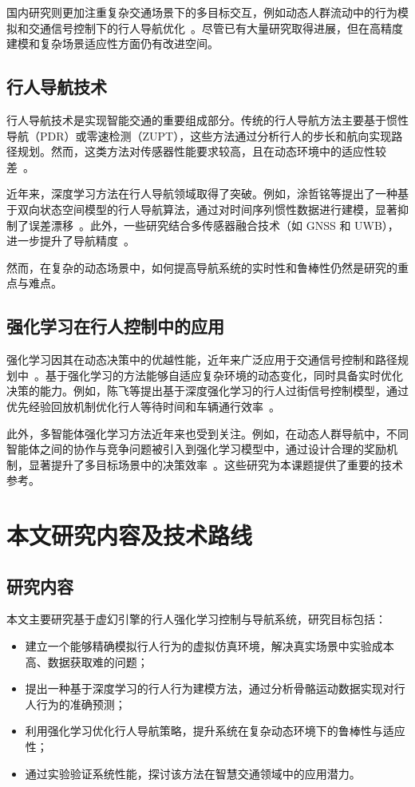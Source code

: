 国内研究则更加注重复杂交通场景下的多目标交互，例如动态人群流动中的行为模拟和交通信号控制下的行人导航优化~\cite{key10}。尽管已有大量研究取得进展，但在高精度建模和复杂场景适应性方面仍有改进空间。

\subsection{行人导航技术}

行人导航技术是实现智能交通的重要组成部分。传统的行人导航方法主要基于惯性导航（PDR）或零速检测（ZUPT），这些方法通过分析行人的步长和航向实现路径规划。然而，这类方法对传感器性能要求较高，且在动态环境中的适应性较差~\cite{key11,key12}。

近年来，深度学习方法在行人导航领域取得了突破。例如，涂哲铭等提出了一种基于双向状态空间模型的行人导航算法，通过对时间序列惯性数据进行建模，显著抑制了误差漂移~\cite{key13}。此外，一些研究结合多传感器融合技术（如 GNSS 和 UWB），进一步提升了导航精度~\cite{key14}。

然而，在复杂的动态场景中，如何提高导航系统的实时性和鲁棒性仍然是研究的重点与难点。

\subsection{强化学习在行人控制中的应用}

强化学习因其在动态决策中的优越性能，近年来广泛应用于交通信号控制和路径规划中~\cite{key15}。基于强化学习的方法能够自适应复杂环境的动态变化，同时具备实时优化决策的能力。例如，陈飞等提出基于深度强化学习的行人过街信号控制模型，通过优先经验回放机制优化行人等待时间和车辆通行效率~\cite{key16}。

此外，多智能体强化学习方法近年来也受到关注。例如，在动态人群导航中，不同智能体之间的协作与竞争问题被引入到强化学习模型中，通过设计合理的奖励机制，显著提升了多目标场景中的决策效率~\cite{key17}。这些研究为本课题提供了重要的技术参考。

\section{本文研究内容及技术路线}

\subsection{研究内容}

本文主要研究基于虚幻引擎的行人强化学习控制与导航系统，研究目标包括：
\begin{itemize}
    \item 建立一个能够精确模拟行人行为的虚拟仿真环境，解决真实场景中实验成本高、数据获取难的问题；
    \item 提出一种基于深度学习的行人行为建模方法，通过分析骨骼运动数据实现对行人行为的准确预测；
    \item 利用强化学习优化行人导航策略，提升系统在复杂动态环境下的鲁棒性与适应性；
    \item 通过实验验证系统性能，探讨该方法在智慧交通领域中的应用潜力。
\end{itemize}

